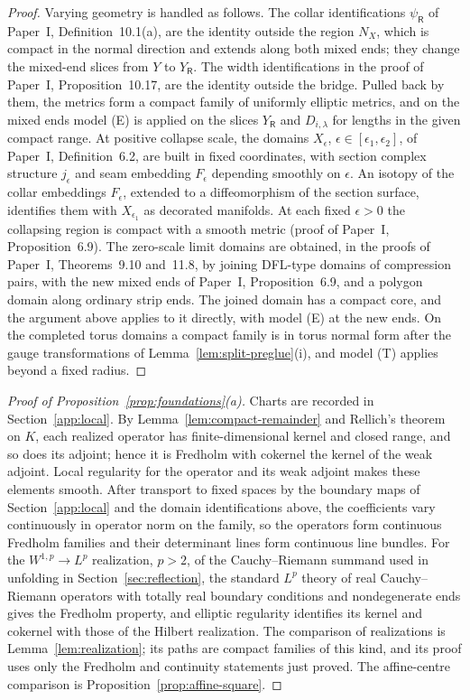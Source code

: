 \documentclass[11pt]{amsart}
\theoremstyle{definition}
\theoremstyle{remark}
\theoremstyle{plain}
\numberwithin{equation}{section}
\begin{document}
\begin{proof}
Varying geometry is handled as follows. The collar identifications
$\psi_{\mathsf R}$ of Paper~I, Definition~10.1(a), are the identity outside
the region $N_X$, which is compact in the normal direction and extends
along both mixed ends; they change the mixed-end slices from $Y$ to
$Y_{\mathsf R}$. The width identifications in the proof of Paper~I,
Proposition~10.17, are the identity outside the bridge. Pulled back by
them, the metrics form a compact family of uniformly elliptic metrics,
and on the mixed ends model (E) is applied on the slices $Y_{\mathsf R}$
and $D_{i,\lambda}$ for lengths in the given compact range. At positive
collapse scale, the domains $X_\epsilon$, $\epsilon\in[\epsilon_1,\epsilon_2]$, of
Paper~I, Definition~6.2, are built in fixed coordinates, with section
complex structure $j_\epsilon$ and seam embedding $F_\epsilon$ depending smoothly
on $\epsilon$. An isotopy of the collar embeddings $F_\epsilon$, extended to a
diffeomorphism of the section surface, identifies them with $X_{\epsilon_1}$
as decorated manifolds. At each fixed $\epsilon>0$ the collapsing region is
compact with a smooth metric (proof of Paper~I, Proposition~6.9). The zero-scale limit domains are obtained, in
the proofs of Paper~I, Theorems~9.10 and~11.8, by joining DFL-type
domains of compression pairs, with the new mixed ends of Paper~I,
Proposition~6.9, and a polygon domain along ordinary strip ends. The
joined domain has a compact core, and the argument above applies to it
directly, with model (E) at the new ends. On the completed torus domains
a compact family is in torus normal form after the gauge transformations
of Lemma~\ref{lem:split-preglue}(i), and model (T) applies beyond a fixed
radius.
\end{proof}

\begin{proof}[Proof of Proposition~\ref{prop:foundations}(a)]
Charts are recorded in Section~\ref{app:local}. By
Lemma~\ref{lem:compact-remainder} and Rellich's theorem on $K$, each
realized operator has finite-dimensional kernel and closed range, and
so does its adjoint; hence it is Fredholm with cokernel the kernel of
the weak adjoint. Local regularity for the operator and its weak
adjoint makes these elements smooth. After transport to fixed spaces by
the boundary maps of Section~\ref{app:local} and the domain
identifications above, the coefficients vary continuously in operator
norm on the family, so the operators form continuous Fredholm families
and their determinant lines form continuous line bundles. For the
$W^{1,p}\to L^p$ realization, $p>2$, of the Cauchy--Riemann summand used
in unfolding in Section~\ref{sec:reflection}, the standard
$L^p$ theory of real Cauchy--Riemann operators with totally real
boundary conditions and nondegenerate ends gives the Fredholm property,
and elliptic regularity identifies its kernel and cokernel with those
of the Hilbert realization. The comparison of realizations is
Lemma~\ref{lem:realization}; its paths are compact families of this
kind, and its proof uses only the Fredholm and continuity statements
just proved. The affine-centre comparison is
Proposition~\ref{prop:affine-square}.
\end{proof}
\end{document}
